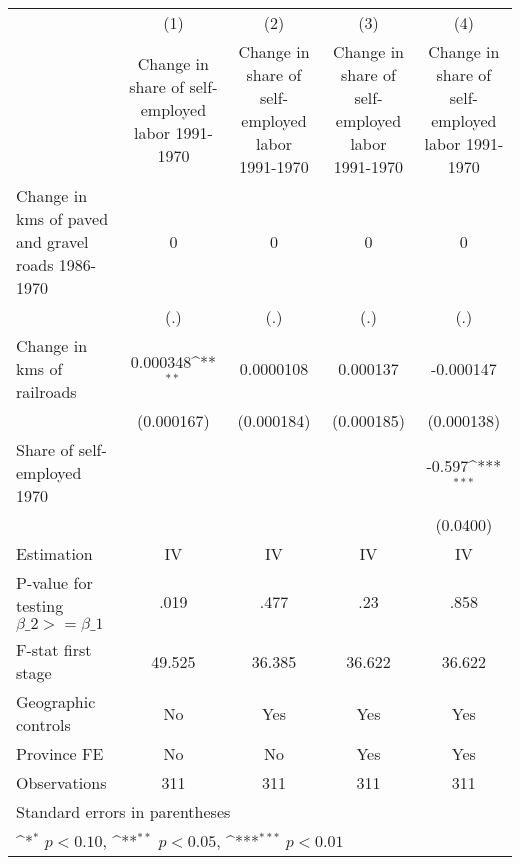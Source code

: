 {
\def\sym#1{\ifmmode^{#1}\else\(^{#1}\)\fi}
\begin{tabular}{l*{4}{c}}
\hline\hline
                    &\multicolumn{1}{c}{(1)}&\multicolumn{1}{c}{(2)}&\multicolumn{1}{c}{(3)}&\multicolumn{1}{c}{(4)}\\
                    &\multicolumn{1}{c}{Change in share of self-employed labor 1991-1970}&\multicolumn{1}{c}{Change in share of self-employed labor 1991-1970}&\multicolumn{1}{c}{Change in share of self-employed labor 1991-1970}&\multicolumn{1}{c}{Change in share of self-employed labor 1991-1970}\\
\hline
Change in kms of paved and gravel roads 1986-1970&           0         &           0         &           0         &           0         \\
                    &         (.)         &         (.)         &         (.)         &         (.)         \\
[1em]
Change in kms of railroads&    0.000348\sym{**} &   0.0000108         &    0.000137         &   -0.000147         \\
                    &  (0.000167)         &  (0.000184)         &  (0.000185)         &  (0.000138)         \\
[1em]
Share of self-employed 1970&                     &                     &                     &      -0.597\sym{***}\\
                    &                     &                     &                     &    (0.0400)         \\
\hline
Estimation          &          IV         &          IV         &          IV         &          IV         \\
P-value for testing $\beta\_2 >= \beta\_1$&        .019         &        .477         &         .23         &        .858         \\
F-stat first stage  &      49.525         &      36.385         &      36.622         &      36.622         \\
Geographic controls &          No         &         Yes         &         Yes         &         Yes         \\
Province FE         &          No         &          No         &         Yes         &         Yes         \\
Observations        &         311         &         311         &         311         &         311         \\
\hline\hline
\multicolumn{5}{l}{\footnotesize Standard errors in parentheses}\\
\multicolumn{5}{l}{\footnotesize \sym{*} \(p<0.10\), \sym{**} \(p<0.05\), \sym{***} \(p<0.01\)}\\
\end{tabular}
}

